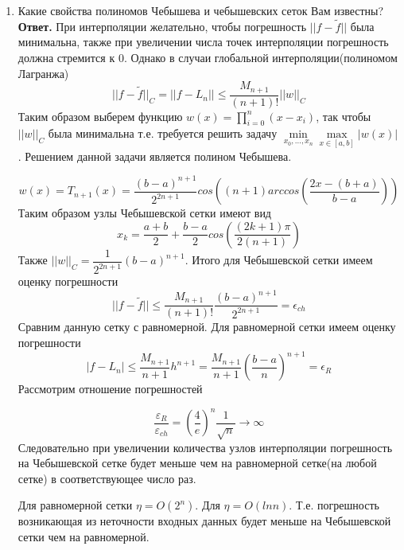 \documentclass{article}
\begin{document}
\begin{enumerate}
	
	
        \item Какие свойства полиномов Чебышева и чебышевских сеток Вам известны?
        \newline 
        {\bfseries Ответ. } 
        При интерполяции желательно, чтобы погрешность $||f-\widetilde{f}||$ была минимальна, также при увеличении числа точек интерполяции погрешность должна стремится к 0. Однако в случаи глобальной интерполяции(полиномом Лагранжа) 
	\[
	||f-\widetilde{f}||_C=||f-L_n|| \le \frac{M_{n+1}}{(n+1)!}||w||_C
	\]
	Таким образом выберем функцию $w(x) = \prod_{i=0}^{n}(x-x_i)$, так чтобы $||w||_C$ была минимальна т.е. требуется решить задачу $\min \limits_{x_0,\ldots ,x_n} \max \limits_{x\in [a,b]} |w(x)|$. Решением данной задачи является полином Чебышева.
	
	\[
	w(x)=T_{n+1}(x)=\frac{(b-a)^{n+1}}{2^{2n+1}} cos((n+1)arccos(\frac{2x-(b+a)}{b-a}))
	\]
	Таким образом узлы Чебышевской сетки имеют вид
	\[
	x_k=\frac{a+b}{2}+\frac{b-a}{2}cos(\frac{(2k+1)\pi}{2(n+1)})
	\]
	Также $||w||_C=\dfrac{1}{2^{2n+1}}(b-a)^{n+1}$. Итого для Чебышевской сетки имеем оценку погрешности
	\[
	||f-\widetilde{f}||\le \frac{M_{n+1}}{(n+1)!}\frac{(b-a)^{n+1}}{2^{2n+1}} = \epsilon_{ch}
	\]
	Сравним данную сетку с равномерной. Для равномерной сетки имеем оценку погрешности
	\[
	|f-L_n|\le \frac{M_{n+1}}{n+1}h^{n+1} = \frac{M_{n+1}}{n+1}(\frac{b-a}{n})^{n+1} = \epsilon_{R}
	\]
	Рассмотрим отношение погрешностей

	\[
	\frac{\varepsilon_{R}}{\varepsilon_{ch}} = (\frac{4}{e})^n \frac{1}{\sqrt{n}} \rightarrow \infty
	\]
	Следовательно при увеличении количества узлов интерполяции погрешность на Чебышевской сетке будет меньше чем на равномерной сетке(на любой сетке) в соответствующее число раз.
	
	
	\noindent 
	Для равномерной сетки $\eta=O(2^n)$. Для $\eta = O(lnn)$. Т.е. погрешность возникающая из неточности входных данных будет меньше на Чебышевской сетки чем на равномерной.
    \end{enumerate}    

    \newpage
\end{document}
